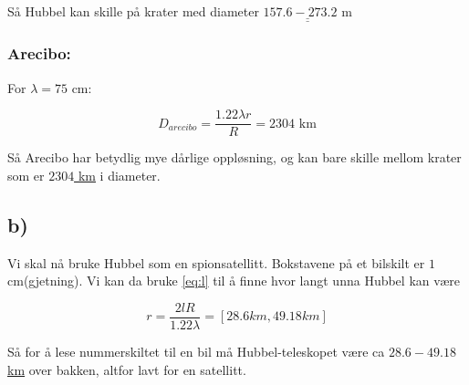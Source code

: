 \documentclass[a4paper,norsk, 10pt]{article}
\begin{document}
Så Hubbel kan skille på krater med diameter $\underline{\underline{157.6-273.2 \text{ m}}}$

\subsubsection*{Arecibo:}

For $\lambda = 75$ cm:

\begin{equation}
D_{arecibo} = \frac{1.22\lambda r}{R} = 2304 \text{ km}
\end{equation}

Så Arecibo har betydlig mye dårlige oppløsning, og kan bare skille mellom krater som er \underline{\underline{$2304$ km}} i diameter.

\subsection*{b)}

Vi skal nå bruke Hubbel som en spionsatellitt. Bokstavene på et bilskilt er $1$ cm(gjetning). Vi kan da bruke \eqref{eq:l} til å finne hvor langt unna Hubbel kan være

\begin{equation}
r = \frac{2lR}{1.22\lambda} = [28.6 km, 49.18km]
\end{equation}

Så for å lese nummerskiltet til en bil må Hubbel-teleskopet være ca \underline{\underline{$28.6 - 49.18$ km}} over bakken, altfor lavt for en satellitt.
\end{document}
